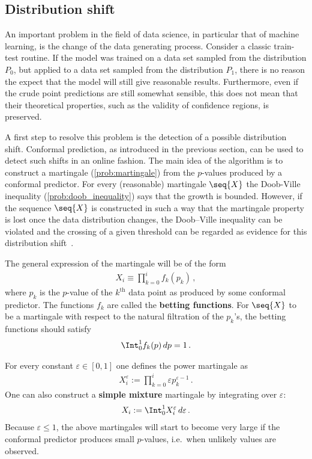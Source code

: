 \subsection{Distribution shift}

    An important problem in the field of data science, in particular that of machine learning, is the change of the data generating process. Consider a classic train-test routine. If the model was trained on a data set sampled from the distribution $P_0$, but applied to a data set sampled from the distribution $P_1$, there is no reason the expect that the model will still give reasonable results. Furthermore, even if the crude point predictions are still somewhat sensible, this does not mean that their theoretical properties, such as the validity of confidence regions, is preserved.

    A first step to resolve this problem is the detection of a possible distribution shift. Conformal prediction, as introduced in the previous section, can be used to detect such shifts in an online fashion. The main idea of the algorithm is to construct a martingale (\cref{prob:martingale}) from the $p$-values produced by a conformal predictor. For every (reasonable) martingale $\seq{X}$ the Doob-Ville inequality (\cref{prob:doob_inequality}) says that the growth is bounded. However, if the sequence $\seq{X}$ is constructed in such a way that the martingale property is lost once the data distribution changes, the Doob--Ville inequality can be violated and the crossing of a given threshold can be regarded as evidence for this distribution shift~\citep{vovk_algorithmic_2005}.

    The general expression of the martingale will be of the form
    \begin{gather}
        X_i\equiv\prod_{k=0}^if_k(p_k)\,,
    \end{gather}
    where $p_k$ is the $p$-value of the $k^{\text{th}}$ data point as produced by some conformal predictor. The functions $f_k$ are called the \textbf{betting functions}. For $\seq{X}$ to be a martingale with respect to the natural filtration of the $p_k$'s, the betting functions should satisfy
    \begin{gather}
        \Int_0^1f_k(p)\,dp = 1\,.
    \end{gather}

    \begin{method}
        For every constant $\varepsilon\in[0,1]$ one defines the power martingale as
        \begin{gather}
            X^\varepsilon_i := \prod_{k=0}^i\varepsilon p^{\varepsilon-1}_k\,.
        \end{gather}
        One can also construct a \textbf{simple mixture} martingale by integrating over $\varepsilon$:
        \begin{gather}
            X_i := \Int_0^1X^\varepsilon_i\,d\varepsilon\,.
        \end{gather}
        Because $\varepsilon\leq1$, the above martingales will start to become very large if the conformal predictor produces small $p$-values, i.e.~when unlikely values are observed.
    \end{method}

